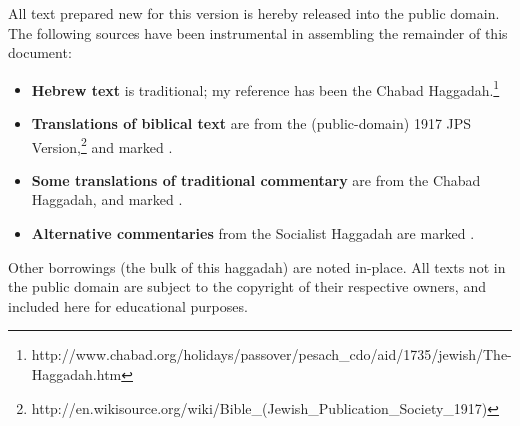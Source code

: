\documentclass[a4paper,12pt,openany]{memoir}
\newcommand{\CSrc}{}
\newcommand{\JSrc}{\textsuperscript{\upshape{[J]}}}
\newcommand{\LSrc}{\textsuperscript{\upshape{[L]}}}
\newcommand{\SSrc}{\textsuperscript{\upshape{[S]}}}
\begin{document}
All text prepared new for this version is 
hereby released
into the public domain. The following sources have been instrumental in
assembling the remainder of this document:
\begin{itemize}
  \item {\bfseries Hebrew text} is traditional; my reference has been the Chabad
    Haggadah.\footnote{http://www.chabad.org/holidays/passover/pesach\_cdo/aid/1735/jewish/The-Haggadah.htm}
  \item {\bfseries Translations of biblical text} are from the (public-domain)
    1917 JPS
    Version,\footnote{http://en.wikisource.org/wiki/Bible\_(Jewish\_Publication\_Society\_1917)}
    and marked \JSrc.
  \item {\bfseries Some translations of traditional commentary} are from the
    Chabad Haggadah, and marked \LSrc.
  \item {\bfseries Alternative commentaries} from the Socialist Haggadah
    are marked \SSrc.
\end{itemize}
Other borrowings (the bulk of this haggadah) are noted in-place. All texts not
in the public domain are subject to the copyright of their respective owners,
and included here for educational purposes.
\end{document}
